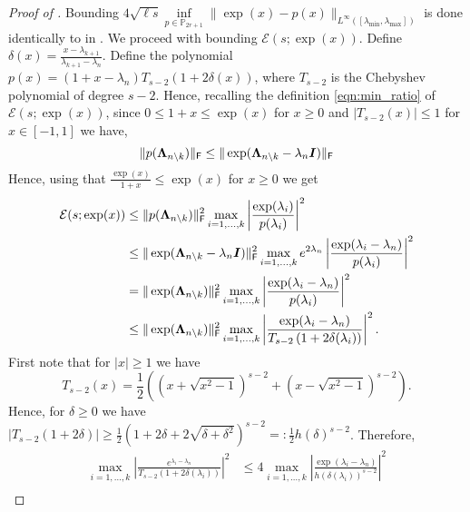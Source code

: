 \begin{appendices}
\begin{proof}[Proof of ]
    Bounding $4\sqrt{\ell s}\inf\limits_{p \in \mathbb{P}_{2r+1}}\|\exp(x)-p(x)\|_{L^{\infty}([\lambda_{\min},\lambda_{\max}])}$ is done identically to in . We proceed with bounding $\mathcal{E}(s;\exp(x))$. Define $\delta(x) = \frac{x-\lambda_{k+1}}{\lambda_{k+1} - \lambda_n}$. Define the polynomial $p(x) = (1+x-\lambda_{n})T_{s-2}\left(1 + 2 \delta(x)\right)$, where $T_{s-2}$ is the Chebyshev polynomial of degree $s-2$. 
    Hence, recalling the definition \cref{eqn:min_ratio} of $\mathcal{E}(s;\exp(x))$, since $0\leq 1+x \leq \exp(x)$ for $x\geq 0$ and $|T_{s-2}(x)| \leq 1$ for $x \in [-1,1]$ we have,
    \[
    \|p(\bm{\Lambda}_{n \setminus k})\|_{\textsf{\textup{F}}}
    \leq \|\exp(\bm{\Lambda}_{n \setminus k} - \lambda_{n}\bm{I})\|_{\textsf{\textup{F}}}\]
    Hence, using that $\frac{\exp(x)}{1+x} \leq \exp(x)$ for $x \geq 0$ we get
    \begin{align}
        \mathcal{E}(s;\exp(x)) 
        &\leq \|p(\bm{\Lambda}_{n \setminus k})\|_{\textsf{\textup{F}}}^2 \max\limits_{i=1,\ldots,k} \left|\frac{\exp(\lambda_i)}{p(\lambda_i)}\right|^2 
        \nonumber\\&\leq 
        \|\exp(\bm{\Lambda}_{n \setminus k}-\lambda_{n}\bm{I})\|_{\textsf{\textup{F}}}^2\max\limits_{i=1,\ldots,k} e^{2\lambda_{n}} \left|\frac{\exp(\lambda_i-\lambda_{n})}{p(\lambda_i)}\right|^2 
        \nonumber\\&=\|\exp(\bm{\Lambda}_{n \setminus k})\|_{\textsf{\textup{F}}}^2\max\limits_{i=1,\ldots,k} \left|\frac{\exp(\lambda_i-\lambda_{n})}{p(\lambda_i)}\right|^2
        \nonumber\\&\leq\|\exp(\bm{\Lambda}_{n \setminus k})\|_{\textsf{\textup{F}}}^2\max\limits_{i=1,\ldots,k} \left|\frac{\exp(\lambda_i-\lambda_{n})}{T_{s-2}\left(1 + 2 \delta(\lambda_i)\right)}\right|^2.
        \label{eqn:Esexp_bd}
    \end{align}
    First note that for $|x| \geq 1$ we have
    \begin{equation*}
        T_{s-2}(x) = \frac{1}{2}\left(\left(x + \sqrt{x^2-1}\right)^{s-2} + \left(x - \sqrt{x^2-1}\right)^{s-2} \right).
    \end{equation*}
    Hence, for $\delta \geq 0$ we have $|T_{s-2}(1+2\delta)| \geq \frac{1}{2}(1+2\delta + 2\sqrt{\delta + \delta^2})^{s-2} =: \frac{1}{2}h(\delta)^{s-2}$. Therefore,
    \begin{align*}
        \max\limits_{i=1,\ldots,k} \left|\frac{e^{\lambda_i-\lambda_{n}}}{T_{s-2}\left(1 + 2 \delta(\lambda_i)\right)}\right|^2 &\leq 4 \max\limits_{i=1,\ldots,k} \left|\frac{\exp(\lambda_i-\lambda_{n})}{h(\delta(\lambda_i))^{s-2}}\right|^2\\

\end{align*}
\end{proof}
\end{appendices}
